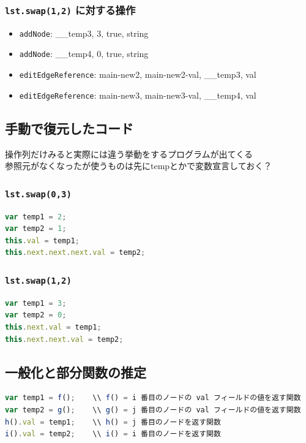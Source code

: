 \documentclass{article}
\begin{document}
\subsubsection{\texttt{lst.swap(1,2)} に対する操作}
\begin{itemize}
  \item \texttt{addNode}: \_\_temp3, 3, true, string
  \item \texttt{addNode}: \_\_temp4, 0, true, string
  \item \texttt{editEdgeReference}: main-new2, main-new2-val, \_\_temp3, val
  \item \texttt{editEdgeReference}: main-new3, main-new3-val, \_\_temp4, val
\end{itemize}

\subsection{手動で復元したコード}
操作列だけみると実際には違う挙動をするプログラムが出てくる   \\
参照元がなくなったが使うものは先にtempとかで変数宣言しておく？
\subsubsection{\texttt{lst.swap(0,3)}}
\begin{lstlisting}[language=JavaScript]
var temp1 = 2;
var temp2 = 1;
this.val = temp1;
this.next.next.next.val = temp2;
\end{lstlisting}

\subsubsection{\texttt{lst.swap(1,2)}}
\begin{lstlisting}[language=JavaScript]
var temp1 = 3;
var temp2 = 0;
this.next.val = temp1;
this.next.next.val = temp2;
\end{lstlisting}

\subsection{一般化と部分関数の推定}
\begin{lstlisting}[language=JavaScript]
var temp1 = f();    \\ f() = i 番目のノードの val フィールドの値を返す関数
var temp2 = g();    \\ g() = j 番目のノードの val フィールドの値を返す関数
h().val = temp1;    \\ h() = j 番目のノードを返す関数
i().val = temp2;    \\ i() = i 番目のノードを返す関数
\end{lstlisting}
\end{document}
